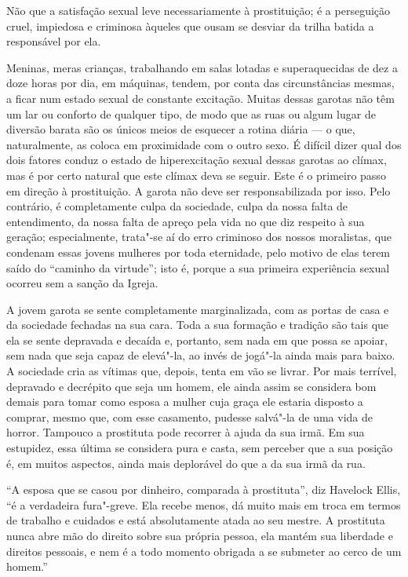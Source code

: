 Não que a satisfação sexual leve necessariamente à prostituição; é a
perseguição cruel, impiedosa e criminosa àqueles que ousam se desviar da
trilha batida a responsável por ela.

Meninas, meras crianças, trabalhando em salas lotadas e superaquecidas
de dez a doze horas por dia, em máquinas, tendem, por conta das
circunstâncias mesmas, a ficar num estado sexual de constante excitação.
Muitas dessas garotas não têm um lar ou conforto de qualquer tipo, de
modo que as ruas ou algum lugar de diversão barata são os únicos meios
de esquecer a rotina diária --- o que, naturalmente, as coloca em
proximidade com o outro sexo. É difícil dizer qual dos dois fatores
conduz o estado de hiperexcitação sexual dessas garotas ao clímax, mas é
por certo natural que este clímax deva se seguir. Este é o primeiro
passo em direção à prostituição. A garota não deve ser responsabilizada
por isso. Pelo contrário, é completamente culpa da sociedade, culpa da
nossa falta de entendimento, da nossa falta de apreço pela vida no que
diz respeito à sua geração; especialmente, trata"-se aí do erro
criminoso dos nossos moralistas, que condenam essas jovens mulheres por
toda eternidade, pelo motivo de elas terem saído do ``caminho da
virtude''; isto é, porque a sua primeira experiência sexual ocorreu sem
a sanção da Igreja.

A jovem garota se sente completamente marginalizada, com as portas de
casa e da sociedade fechadas na sua cara. Toda a sua formação e tradição
são tais que ela se sente depravada e decaída e,
portanto, sem nada em que possa se apoiar, sem nada que seja capaz de
elevá"-la, ao invés de jogá"-la ainda mais para baixo. A sociedade cria as
vítimas que, depois, tenta em vão se livrar. Por mais terrível,
depravado e decrépito que seja um homem, ele ainda assim se considera
bom demais para tomar como esposa a mulher cuja graça ele estaria
disposto a comprar, mesmo que, com esse casamento, pudesse salvá"-la de
uma vida de horror. Tampouco a prostituta pode recorrer à ajuda da sua
irmã. Em sua estupidez, essa última se considera pura e casta, sem
perceber que a sua posição é, em muitos aspectos, ainda mais
deplorável do que a da sua irmã da rua.

``A esposa que se casou por dinheiro, comparada à prostituta'',
diz Havelock Ellis, ``é a verdadeira fura"-greve. Ela recebe menos, dá muito
mais em troca em termos de trabalho e cuidados e está absolutamente
atada ao seu mestre. A prostituta nunca abre mão do direito sobre sua
própria pessoa, ela mantém sua liberdade e direitos pessoais, e nem é a
todo momento obrigada a se submeter ao cerco de um homem.''

